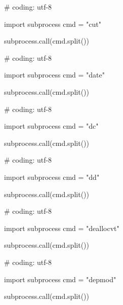 \begin{mylisting}[label={lst:acpid},language=sh,caption=cut]

# coding: utf-8

import subprocess
cmd = "cut"

subprocess.call(cmd.split())

\end{mylisting}

\begin{mylisting}[label={lst:acpid},language=sh,caption=date]

# coding: utf-8

import subprocess
cmd = "date"

subprocess.call(cmd.split())

\end{mylisting}

\begin{mylisting}[label={lst:acpid},language=sh,caption=dc]

# coding: utf-8

import subprocess
cmd = "dc"

subprocess.call(cmd.split())

\end{mylisting}

\begin{mylisting}[label={lst:acpid},language=sh,caption=dd]

# coding: utf-8

import subprocess
cmd = "dd"

subprocess.call(cmd.split())

\end{mylisting}

\begin{mylisting}[label={lst:acpid},language=sh,caption=deallocvt]

# coding: utf-8

import subprocess
cmd = "deallocvt"

subprocess.call(cmd.split())

\end{mylisting}

\begin{mylisting}[label={lst:acpid},language=sh,caption=depmod]

# coding: utf-8

import subprocess
cmd = "depmod"

subprocess.call(cmd.split())

\end{mylisting}

